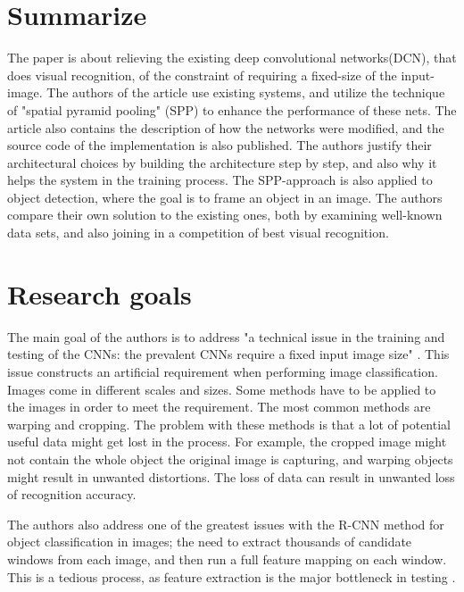 \section{Summarize}
The paper is about relieving the existing deep convolutional networks(DCN), that does visual recognition, of the constraint of requiring a fixed-size of the input-image. The authors of the article use existing systems, and utilize the technique of "spatial pyramid pooling" (SPP) to enhance the performance of these nets. The article also contains the description of how the networks were modified, and the source code of the implementation is also published. The authors justify their architectural choices by building the architecture step by step, and also why it helps the system in the training process. The SPP-approach is also applied to object detection, where the goal is to frame an object in an image. The authors compare their own solution to the existing ones, both by examining well-known data sets, and also joining in a competition of best visual recognition. 


\section{Research goals}
The main goal of the authors is to address "a technical issue in the training and testing of the CNNs: the prevalent CNNs require a fixed input image size" \cite{SPPinDCN}. This issue constructs an artificial requirement when performing image classification. Images come in different scales and sizes. Some methods have to be applied to the images in order to meet the requirement. The most common methods are warping and cropping. The problem with these methods is that a lot of potential useful data might get lost in the process. For example, the cropped image might not contain the whole object the original image is capturing, and warping objects might result in unwanted distortions. The loss of data can result in unwanted loss of recognition accuracy.

The authors also address one of the greatest issues with the R-CNN \cite{R-CNN} method for object classification in images; the need to extract thousands of candidate windows from each image, and then run a full feature mapping on each window. This is a tedious process, as feature extraction is the major bottleneck in testing \cite{SPPinDCN}.


